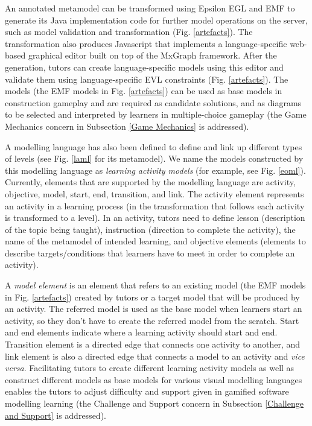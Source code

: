 \documentclass[conference]{IEEEtran}
\begin{document}
An annotated metamodel can be transformed using Epsilon EGL \cite{kolovos2010epsilon} and EMF \cite{steinberg2008emf} to generate its Java implementation code for further model operations on the server, such as model validation and transformation (Fig. \ref{artefacts}). The transformation also produces Javascript that implements a language-specific web-based graphical editor built on top of the MxGraph framework. After the generation, tutors can create language-specific models using this editor and validate them using language-specific EVL \cite{kolovos2006eclipse} constraints (Fig. \ref{artefacts}). The models (the EMF models in Fig. \ref{artefacts}) can be used as base models in construction gameplay and are required as candidate solutions, and as diagrams to be selected and interpreted by learners in multiple-choice gameplay (the Game Mechanics concern in Subsection \ref{Game Mechanics} is addressed).  

A modelling language has also been defined to define and link up different types of levels (see Fig. \ref{laml} for its metamodel). We name the models constructed by this modelling language as \emph{learning activity models} (for example, see Fig. \ref{eoml}). Currently, elements that are supported by the modelling language are activity, objective, model, start, end, transition, and link. The activity element represents an activity in a learning process (in the transformation that follows each activity is transformed to a level). In an activity, tutors need to define lesson (description of the topic being taught), instruction (direction to complete the activity), the name of the metamodel of intended learning, and objective elements (elements to describe targets/conditions that learners have to meet in order to complete an activity). 

A \emph{model element} is an element that refers to an existing model (the EMF models in Fig. \ref{artefacts}) created by tutors or a target model that will be produced by an activity. The referred model is used as the base model when learners start an activity, so they don't have to create the referred model from the scratch. Start and end elements indicate where a learning activity should start and end. Transition element is a directed edge that connects one activity to another, and link element is also a directed edge that connects a model to an activity and \textit{vice versa}. Facilitating tutors to create different learning activity models as well as construct different models as base models for various visual modelling languages enables the tutors to adjust difficulty and support given in gamified software modelling learning (the Challenge and Support concern in Subsection \ref{Challenge and Support} is addressed). 
\end{document}
